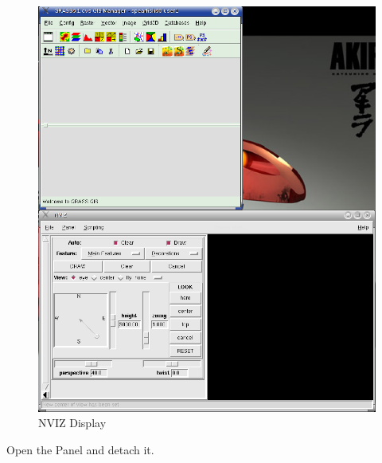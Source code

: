 \begin{figure}[htbp]
   \centering
   \includegraphics[scale=0.2]{nviz001.png}
   \caption{NVIZ Display}
   \label{fig:nviz001}
\end{figure}

Open the Panel and detach it.

